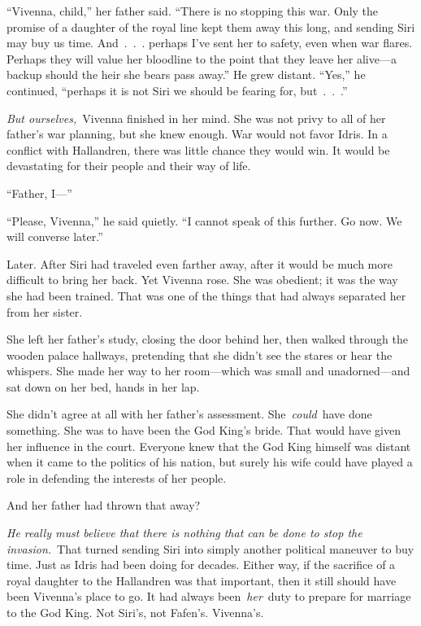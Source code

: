 “Vivenna, child,” her father said. “There is no stopping this war. Only the promise of a daughter of the royal line kept them away this long, and sending Siri may buy us time. And~.~.~. perhaps I’ve sent her to safety, even when war flares. Perhaps they will value her bloodline to the point that they leave her alive—a backup should the heir she bears pass away.” He grew distant. “Yes,” he continued, “perhaps it is not Siri we should be fearing for, but~.~.~.”

\textit{But ourselves,}~Vivenna finished in her mind. She was not privy to all of her father’s war planning, but she knew enough. War would not favor Idris. In a conflict with Hallandren, there was little chance they would win. It would be devastating for their people and their way of life.

“Father, I—”

“Please, Vivenna,” he said quietly. “I cannot speak of this further. Go now. We will converse later.”

Later. After Siri had traveled even farther away, after it would be much more difficult to bring her back. Yet Vivenna rose. She was obedient; it was the way she had been trained. That was one of the things that had always separated her from her sister.

She left her father’s study, closing the door behind her, then walked through the wooden palace hallways, pretending that she didn’t see the stares or hear the whispers. She made her way to her room—which was small and unadorned—and sat down on her bed, hands in her lap.

She didn’t agree at all with her father’s assessment. She~\textit{could}~have done something. She was to have been the God King’s bride. That would have given her influence in the court. Everyone knew that the God King himself was distant when it came to the politics of his nation, but surely his wife could have played a role in defending the interests of her people.

And her father had thrown that away?

\textit{He really must believe that there is nothing that can be done to stop the invasion.}~That turned sending Siri into simply another political maneuver to buy time. Just as Idris had been doing for decades. Either way, if the sacrifice of a royal daughter to the Hallandren was that important, then it still should have been Vivenna’s place to go. It had always been~\textit{her}~duty to prepare for marriage to the God King. Not Siri’s, not Fafen’s. Vivenna’s.


